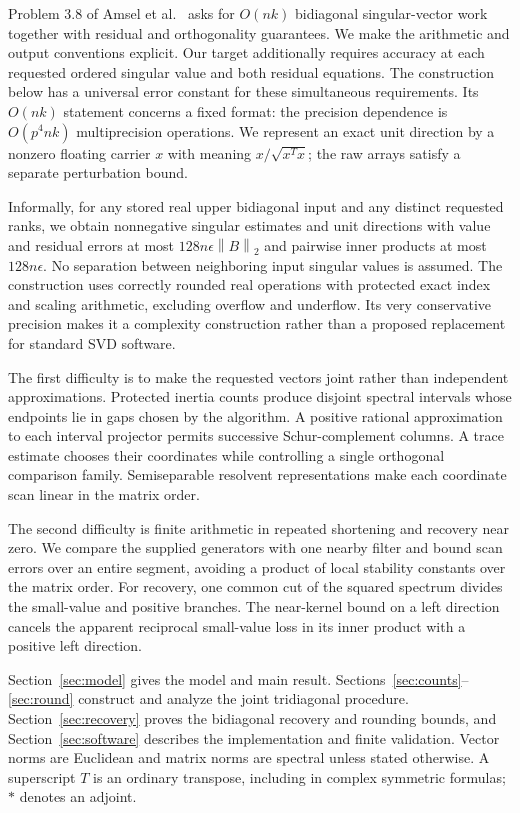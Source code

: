 \documentclass[11pt]{article}
\theoremstyle{remark}\newtheorem{remark}[theorem]{Remark}
\newcommand{\norm}[1]{\left\lVert#1\right\rVert}
\begin{document}
Problem 3.8 of Amsel et al.~\cite{open} asks for $O(nk)$ bidiagonal singular-vector
work together with residual and orthogonality guarantees. We make the
arithmetic and output conventions explicit. Our target additionally requires
accuracy at each requested ordered singular value and both residual equations.
The construction below has a universal error constant for these simultaneous
requirements. Its $O(nk)$ statement concerns a fixed format: the precision
dependence is $O(p^4nk)$ multiprecision operations. We represent an exact unit
direction by a nonzero floating carrier $x$ with meaning
$x/\sqrt{x^Tx}$; the raw arrays satisfy a separate perturbation bound.

Informally, for any stored real upper bidiagonal input and any distinct
requested ranks, we obtain nonnegative singular estimates and unit directions
with value and residual errors at most $128n\epsilon\norm{B}_2$ and pairwise
inner products at most $128n\epsilon$. No separation between neighboring input
singular values is assumed. The construction uses correctly rounded real
operations with protected exact index and scaling arithmetic, excluding
overflow and underflow. Its very conservative precision makes it a complexity
construction rather than a proposed replacement for standard SVD software.

The first difficulty is to make the requested vectors joint rather than
independent approximations. Protected inertia counts produce disjoint spectral
intervals whose endpoints lie in gaps chosen by the algorithm. A positive
rational approximation to each interval projector permits successive
Schur-complement columns. A trace estimate chooses their coordinates while
controlling a single orthogonal comparison family. Semiseparable resolvent
representations make each coordinate scan linear in the matrix order.

The second difficulty is finite arithmetic in repeated shortening and recovery
near zero. We compare the supplied generators with one nearby filter and bound
scan errors over an entire segment, avoiding a product of local stability
constants over the matrix order. For recovery, one common cut of the squared
spectrum divides the small-value and positive branches. The near-kernel bound
on a left direction cancels the apparent reciprocal small-value loss in its
inner product with a positive left direction.

Section~\ref{sec:model} gives the model and main result.
Sections~\ref{sec:counts}--\ref{sec:round} construct and analyze the joint
tridiagonal procedure. Section~\ref{sec:recovery} proves the bidiagonal
recovery and rounding bounds, and Section~\ref{sec:software} describes the
implementation and finite validation. Vector norms are Euclidean and matrix
norms are spectral unless stated otherwise. A superscript $T$ is an ordinary
transpose, including in complex symmetric formulas; $*$ denotes an adjoint.
\end{document}
